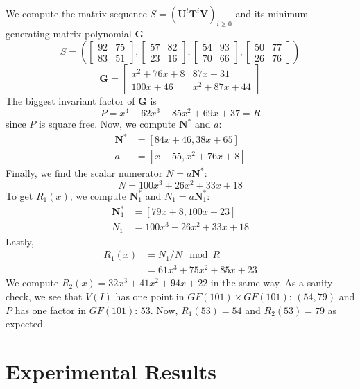 \documentclass[12pt]{article}
\def\mG{\mathbf{G}}
\def\mN{\mathbf{N}}
\def\mT{\mathbf{T}}
\def\mU{\mathbf{U}}
\def\mV{\mathbf{V}}
\begin{document}
We compute the matrix sequence $S = (\mU^t\mT^i\mV)_{i\ge0}$ and its minimum generating matrix polynomial $\mG$
$$ S = (
\begin{bmatrix}
92& 75\\  
83& 51
\end{bmatrix},
\begin{bmatrix}
57& 82\\  
23& 16
\end{bmatrix},
\begin{bmatrix}
54& 93\\  
70& 66
\end{bmatrix},
\begin{bmatrix}
50& 77\\
26& 76
\end{bmatrix}
)$$
$$ \mG =
\begin{bmatrix}
x^2 + 76x + 8&       87x + 31\\
    100x + 46& x^2 + 87x + 44
\end{bmatrix}
$$
The biggest invariant factor of $\mG$ is 
$$P = x^4 + 62x^3 + 85x^2 + 69x + 37 = R$$
since $P$ is square free. 
Now, we compute $\mN^*$ and $a$:
\begin{align*}
\mN^* &=[84x + 46, 38x + 65]\\
a &= [x + 55, x^2 + 76x + 8]
\end{align*}
Finally, we find the scalar numerator $N = a\mN^*$:
$$ N = 100x^3 + 26x^2 + 33x + 18$$
To get $R_1(x)$, we compute $\mN_1^*$ and $N_1=a\mN_1^*$:
\begin{align*}
\mN_1^* &= [79x + 8, 100x + 23]\\
N_1 &= 100x^3 + 26x^2 + 33x + 18
\end{align*}
Lastly,
\begin{align*}
R_1(x) &= N_1 / N \mod R \\
       &= 61x^3 + 75x^2 + 85x + 23
\end{align*}
We compute $R_2(x)= 32x^3 + 41x^2 + 94x + 22$ in the same way. 
As a sanity check,
we see that $V(I)$ has one point in $GF(101) \times GF(101)$:
$(54,79)$ and $P$ has one factor in $GF(101)$: $53$. Now,
$R_1(53) = 54$ and $R_2(53) = 79$ as expected.
\newpage
\section{Experimental Results}

\newpage


\end{document}
